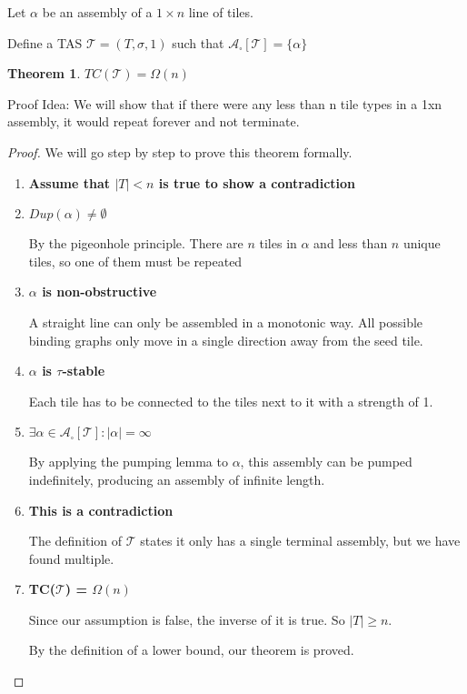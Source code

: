 \documentclass[12pt]{article}
\newtheorem{theorem}{Theorem}
\begin{document}
Let $\alpha$ be an assembly of a $1 \times n$ line of tiles.

Define a TAS $\mathcal{T} = (T, \sigma, 1)$ such that $\mathcal{A}_\square[\mathcal{T}] = \{ \alpha \}$

\begin{theorem}
	$TC(\mathcal{T}) = \Omega(n)$
\end{theorem}

Proof Idea:  We will show that if there were any less than n tile types in a 1xn assembly, it would repeat forever and not terminate.

\begin{proof}
	We will go step by step to prove this theorem formally.

	\begin{enumerate}
		\item \textbf{Assume that $|T| < n$ is true to show a contradiction}

		\item \textbf{$Dup(\alpha) \neq \emptyset$}

		By the pigeonhole principle. There are $n$ tiles in $\alpha$ and less than $n$ unique tiles, so one of them must be repeated

		\item \textbf{$\alpha$ is non-obstructive}

            A straight line can only be assembled in a monotonic way. All possible binding graphs only move in a single direction away from the seed tile.

        \item \textbf{$\alpha$ is $\tau$-stable}

            Each tile has to be connected to the tiles next to it with a strength of 1. 


		\item \textbf{$\exists \alpha \in \mathcal{A}_\square[\mathcal{T}] : |\alpha| = \infty $}

            By applying the pumping lemma to $\alpha$, this assembly can be pumped indefinitely, producing an assembly of infinite length.

		\item \textbf{This is a contradiction}

		The definition of $\mathcal{T}$ states it only has a single terminal assembly, but we have found multiple.

		\item \textbf{TC($\mathcal{T}$) = $\Omega(n)$}

		Since our assumption is false, the inverse of it is true. So $|T| \geq n$.

		By the definition of a lower bound, our theorem is proved.

	\end{enumerate}
\end{proof}
\end{document}
